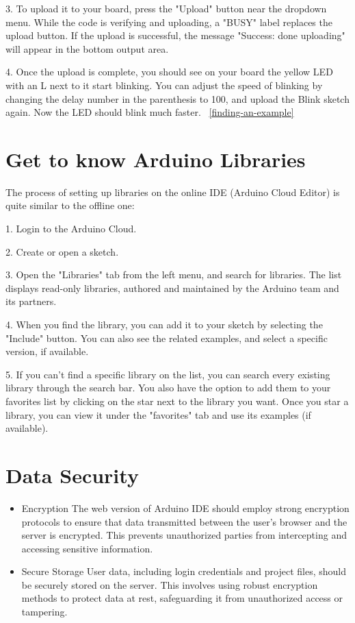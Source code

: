3. To upload it to your board, press the "Upload" button near the dropdown menu. While the code is verifying and uploading, a "BUSY" label replaces the upload button. If the upload is successful, the message "Success: done uploading" will appear in the bottom output area.

4. Once the upload is complete, you should see on your board the yellow LED with an L next to it start blinking. You can adjust the speed of blinking by changing the delay number in the parenthesis to 100, and upload the Blink sketch again. Now the LED should blink much faster. ~\ref{finding-an-example}

\section{Get to know Arduino Libraries}
The process of setting up libraries on the online IDE (Arduino Cloud Editor) is quite similar to the offline one:

1. Login to the Arduino Cloud.

2. Create or open a sketch.

3. Open the "Libraries" tab from the left menu, and search for libraries. The list displays read-only libraries, authored and maintained by the Arduino team and its partners.

4. When you find the library, you can add it to your sketch by selecting the "Include" button. You can also see the related examples, and select a specific version, if available.

5. If you can't find a specific library on the list, you can search every existing library through the search bar. You also have the option to add them to your favorites list by clicking on the star next to the library you want. Once you star a library, you can view it under the "favorites" tab and use its examples (if available).

\section{Data Security}

\begin{itemize}
	\item{Encryption}
	The web version of Arduino IDE should employ strong encryption protocols to ensure that data transmitted between the user's browser and the server is encrypted. This prevents unauthorized parties from intercepting and accessing sensitive information.
	
	\item{Secure Storage}
	User data, including login credentials and project files, should be securely stored on the server. This involves using robust encryption methods to protect data at rest, safeguarding it from unauthorized access or tampering.
\end{itemize}

